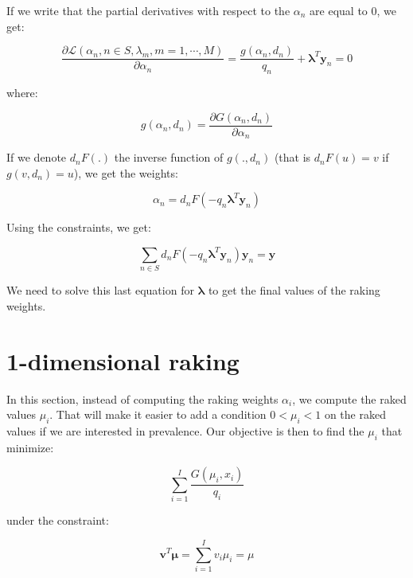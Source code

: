 \documentclass{tex/note}
\begin{document}
If we write that the partial derivatives with respect to the $\alpha_n$ are equal to $0$, we get:

\begin{equation*}
\frac{\partial \mathcal{L} \left( \alpha_n , n \in S , \lambda_m , m = 1 , \cdots , M \right)}{\partial \alpha_n} = \frac{g \left( \alpha_n , d_n \right)}{q_n} + \bm{\lambda}^T \bm{y}_n = 0
\end{equation*}

where:

\begin{equation*}
g \left( \alpha_n , d_n \right) = \frac{\partial G \left( \alpha_n , d_n \right)}{\partial \alpha_n}
\end{equation*}

If we denote $d_n F \left( . \right)$ the inverse function of $g \left( . , d_n \right)$ (that is $d_n F \left( u \right) = v$ if $ g \left( v , d_n \right) = u$), we get the weights:

\begin{equation*}
\alpha_n = d_n F \left( - q_n \bm{\lambda}^T \bm{y}_n \right)
\end{equation*}

Using the constraints, we get:

\begin{equation*}
\sum_{n \in S} d_n F \left( - q_n \bm{\lambda}^T \bm{y}_n \right) \bm{y}_n = \bm{y}
\end{equation*}

We need to solve this last equation for $\bm{\lambda}$ to get the final values of the raking weights.

\section{1-dimensional raking}

In this section, instead of computing the raking weights $\alpha_i$, we compute the raked values $\mu_i$. That will make it easier to add a condition $0 < \mu_i < 1$ on the raked values if we are interested in prevalence. Our objective is then to find the $\mu_i$ that minimize:

\begin{equation*}
\sum_{i = 1}^I \frac{G \left( \mu_i , x_i \right)}{q_i}
\end{equation*}

under the constraint:

\begin{equation*}
\bm{v}^T \bm{\mu} = \sum_{i = 1}^I v_i \mu_i = \mu
\end{equation*}
\end{document}
